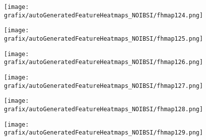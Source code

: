 \hspace{\hsp} 
\begin{subfigure}{\wid\textwidth} 
    \centering 
    \caption{\tiny \sffamily {}} 
    \vspace{\vsp} 
    \texttt{[image: grafix/autoGeneratedFeatureHeatmaps\_NOIBSI/fhmap124.png]} 
\end{subfigure} 
\hspace{\hsp} 
\begin{subfigure}{\wid\textwidth} 
    \centering 
    \caption{\tiny \sffamily {}} 
    \vspace{\vsp} 
    \texttt{[image: grafix/autoGeneratedFeatureHeatmaps\_NOIBSI/fhmap125.png]} 
\end{subfigure} 
\hspace{\hsp} 
\begin{subfigure}{\wid\textwidth} 
    \centering 
    \caption{\tiny \sffamily {}} 
    \vspace{\vsp} 
    \texttt{[image: grafix/autoGeneratedFeatureHeatmaps\_NOIBSI/fhmap126.png]} 
\end{subfigure} 
\hspace{\hsp} 
\begin{subfigure}{\wid\textwidth} 
    \centering 
    \caption{\tiny \sffamily {}} 
    \vspace{\vsp} 
    \texttt{[image: grafix/autoGeneratedFeatureHeatmaps\_NOIBSI/fhmap127.png]} 
\end{subfigure} 
\hspace{\hsp} 
\begin{subfigure}{\wid\textwidth} 
    \centering 
    \caption{\tiny \sffamily {}} 
    \vspace{\vsp} 
    \texttt{[image: grafix/autoGeneratedFeatureHeatmaps\_NOIBSI/fhmap128.png]} 
\end{subfigure} 
\hspace{\hsp} 
\begin{subfigure}{\wid\textwidth} 
    \centering 
    \caption{\tiny \sffamily {}} 
    \vspace{\vsp} 
    \texttt{[image: grafix/autoGeneratedFeatureHeatmaps\_NOIBSI/fhmap129.png]} 
\end{subfigure} 
\hspace{\hsp} 
